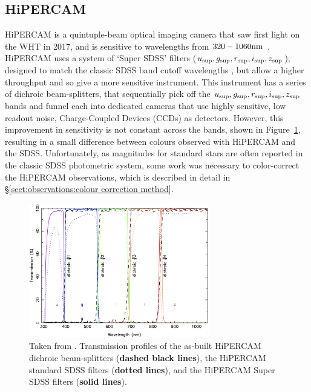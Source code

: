 \subsection{HiPERCAM}
\label{sect:observations:hipercam}

HiPERCAM is a quintuple-beam optical imaging camera that saw first light on the WHT in 2017, and is sensitive to wavelengths from $320 - 1060 \rm nm$ \citep{dhillon2021}.
HiPERCAM uses a system of `Super SDSS' filters ($u_{\rm sup}, g_{\rm sup}, r_{\rm sup}, i_{\rm sup}, z_{\rm sup}$), designed to match the classic SDSS band cutoff wavelengths \citep{fukugita1996}, but allow a higher throughput and so give a more sensitive instrument.
This instrument has a series of dichroic beam-splitters, that sequentially pick off the $u_{\rm sup}, g_{\rm sup}, r_{\rm sup}, i_{\rm sup}, z_{\rm sup}$ bands and funnel each into dedicated cameras that use highly sensitive, low readout noise, Charge-Coupled Devices (CCDs) as detectors.
However, this improvement in sensitivity is not constant across the bands, shown in Figure~\ref{fig:observations:superSDSS throughput comparison}, resulting in a small difference between colours observed with HiPERCAM and the SDSS.
Unfortunately, as magnitudes for standard stars are often reported in the classic SDSS photometric system, some work was necessary to color-correct the HiPERCAM observations, which is described in detail in \S\ref{sect:observations:colour correction method}.
\begin{figure}
    \centering
    \includegraphics[width=0.7\textwidth]{figures/observations/plot_dichs_supersdss_asbuilt_v3.png}
    \caption{Taken from \citet{dhillon2021}. Transmission profiles of the as-built HiPERCAM dichroic beam-splitters ({\bf dashed black lines}), the HiPERCAM standard SDSS filters ({\bf dotted lines}), and the HiPERCAM Super SDSS filters ({\bf solid lines}).}
    \label{fig:observations:superSDSS throughput comparison}
\end{figure}

